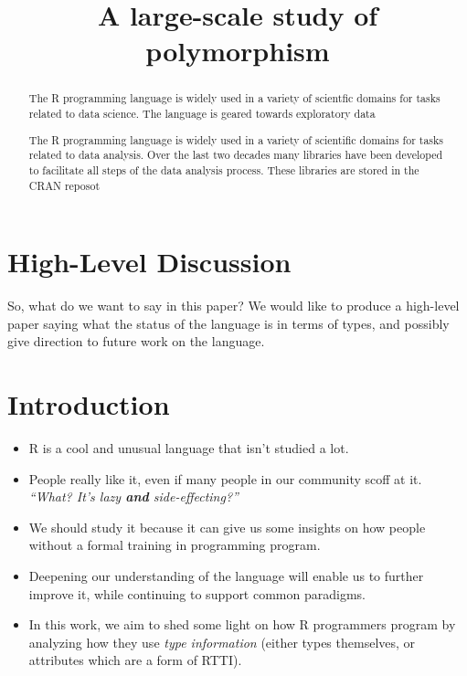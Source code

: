 \documentclass[acmsmall,10pt,review,anonymous]{acmart}\settopmatter{printfolios=true,printccs=false,printacmref=false}
\begin{document}
\title{A large-scale study of polymorphism}

\begin{abstract}
The R programming language is widely used in a variety of scientfic domains
for tasks related to data science. The language is geared towards exploratory
data

The R programming language is widely used in a variety of scientific domains
for tasks related to data analysis. Over the last two decades many libraries
have been developed to facilitate all steps of the data analysis process.
These libraries are stored in the CRAN reposot
\end{abstract}



\maketitle


\section{High-Level Discussion}


So, what do we want to say in this paper?  We would like to produce a
high-level paper saying what the status of the language is in terms of
types, and possibly give direction to future work on the language.


%
\section{Introduction}



\begin{itemize}
    \item R is a cool and unusual language that isn't studied a lot.
    \item People really like it, even if many people in our community scoff at it. \textit{``What? It's lazy \textbf{and} side-effecting?''}
    \item We should study it because it can give us some insights on how people without a formal training in programming program.
    \item Deepening our understanding of the language will enable us to further improve it, while continuing to support common paradigms.
    \item In this work, we aim to shed some light on how R programmers program by analyzing how they use \textit{type information} (either types themselves, or attributes which are a form of RTTI).
\end{itemize}
\end{document}
